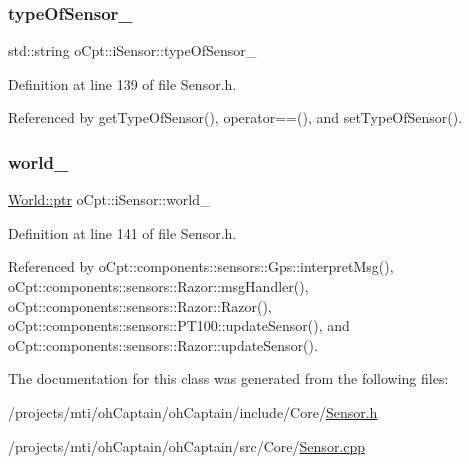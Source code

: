 \subsubsection{\texorpdfstring{type\+Of\+Sensor\+\_\+}{typeOfSensor\_}}
{\footnotesize\ttfamily std\+::string o\+Cpt\+::i\+Sensor\+::type\+Of\+Sensor\+\_\+\hspace{0.3cm}{\ttfamily [protected]}}



Definition at line 139 of file Sensor.\+h.



Referenced by get\+Type\+Of\+Sensor(), operator==(), and set\+Type\+Of\+Sensor().

\hypertarget{classo_cpt_1_1i_sensor_aab033b6462d7e8710c006f19c51e033e}{}\label{classo_cpt_1_1i_sensor_aab033b6462d7e8710c006f19c51e033e} 
\subsubsection{\texorpdfstring{world\+\_\+}{world\_}}
{\footnotesize\ttfamily \hyperlink{classo_cpt_1_1_world_aa6e591e3096d5de71e0cec9039663d67}{World\+::ptr} o\+Cpt\+::i\+Sensor\+::world\+\_\+\hspace{0.3cm}{\ttfamily [protected]}}



Definition at line 141 of file Sensor.\+h.



Referenced by o\+Cpt\+::components\+::sensors\+::\+Gps\+::interpret\+Msg(), o\+Cpt\+::components\+::sensors\+::\+Razor\+::msg\+Handler(), o\+Cpt\+::components\+::sensors\+::\+Razor\+::\+Razor(), o\+Cpt\+::components\+::sensors\+::\+P\+T100\+::update\+Sensor(), and o\+Cpt\+::components\+::sensors\+::\+Razor\+::update\+Sensor().



The documentation for this class was generated from the following files\+:\begin{DoxyCompactItemize}
\item 
/projects/mti/oh\+Captain/oh\+Captain/include/\+Core/\hyperlink{_sensor_8h}{Sensor.\+h}\item 
/projects/mti/oh\+Captain/oh\+Captain/src/\+Core/\hyperlink{_sensor_8cpp}{Sensor.\+cpp}\end{DoxyCompactItemize}
